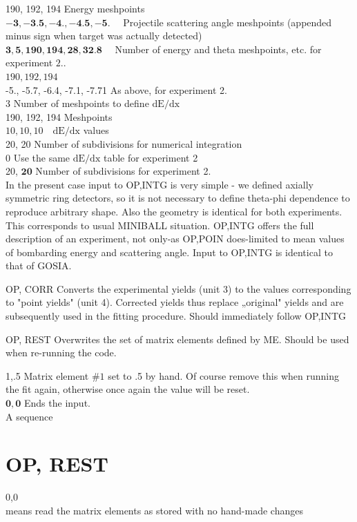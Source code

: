 \documentclass[10pt]{article}
\begin{document}
190, 192, 194 Energy meshpoints\\
$\mathbf{- 3}, \mathbf{- 3 . 5},-\mathbf{4} .,-\mathbf{4 . 5},-\mathbf{5} . \quad$ Projectile scattering angle meshpoints (appended minus sign when target was actually detected)\\
$\mathbf{3}, \mathbf{5}, \mathbf{1 9 0}, \mathbf{1 9 4}, \mathbf{2 8}, \mathbf{3 2 . 8} \quad$ Number of energy and theta meshpoints, etc. for experiment $2 .$.\\
$190,192,194$\\
-5., -5.7, -6.4, -7.1, -7.71 As above, for experiment 2.\\
3 Number of meshpoints to define $\mathrm{dE} / \mathrm{dx}$\\
190, 192, 194 Meshpoints\\
$10,10,10 \quad \mathrm{dE} / \mathrm{dx}$ values\\
20, 20 Number of subdivisions for numerical integration\\
0 Use the same $\mathrm{dE} / \mathrm{dx}$ table for experiment 2\\
20, $\mathbf{2 0}$ Number of subdivisions for experiment 2.\\
In the present case input to OP,INTG is very simple - we defined axially symmetric ring detectors, so it is not necessary to define theta-phi dependence to reproduce arbitrary shape. Also the geometry is identical for both experiments. This corresponds to usual MINIBALL situation. OP,INTG offers the full description of an experiment, not only-as OP,POIN does-limited to mean values of bombarding energy and scattering angle. Input to OP,INTG is identical to that of GOSIA.

OP, CORR Converts the experimental yields (unit 3) to the values corresponding to "point yields" (unit 4). Corrected yields thus replace „original" yields and are subsequently used in the fitting procedure. Should immediately follow OP,INTG

OP, REST Overwrites the set of matrix elements defined by ME. Should be used when re-running the code.

1,.5 Matrix element $\# 1$ set to .5 by hand. Of course remove this when running the fit again, otherwise once again the value will be reset.\\
$\mathbf{0 , 0}$ Ends the input.\\
A sequence

\section*{OP, REST}
0,0\\
means read the matrix elements as stored with no hand-made changes
\end{document}
